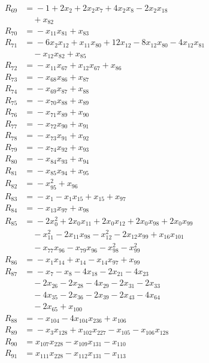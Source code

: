 \begin{align*}
R_{69} &={} -1 +2x_{2} +2x_{2}x_{7} +4x_{2}x_{8} -2x_{2}x_{18} \\
&\quad{} +x_{82} \\
R_{70} &={} -x_{11}x_{81} +x_{83} \\
R_{71} &={} -6x_{2}x_{12} +x_{11}x_{80} +12x_{12} -8x_{12}x_{80} -4x_{12}x_{81} \\
&\quad{} -x_{12}x_{82} +x_{85} \\
R_{72} &={} -x_{11}x_{67} +x_{12}x_{67} +x_{86} \\
R_{73} &={} -x_{68}x_{86} +x_{87} \\
R_{74} &={} -x_{69}x_{87} +x_{88} \\
R_{75} &={} -x_{70}x_{88} +x_{89} \\
R_{76} &={} -x_{71}x_{89} +x_{90} \\
R_{77} &={} -x_{72}x_{90} +x_{91} \\
R_{78} &={} -x_{73}x_{91} +x_{92} \\
R_{79} &={} -x_{74}x_{92} +x_{93} \\
R_{80} &={} -x_{84}x_{93} +x_{94} \\
R_{81} &={} -x_{85}x_{94} +x_{95} \\
R_{82} &={} -x_{95}^{2} +x_{96} \\
R_{83} &={} -x_{1} -x_{1}x_{15} +x_{15} +x_{97} \\
R_{84} &={} -x_{13}x_{97} +x_{98} \\
R_{85} &={} -2x_{0}^{2} +2x_{0}x_{11} +2x_{0}x_{12} +2x_{0}x_{98} +2x_{0}x_{99} \\
&\quad{} -x_{11}^{2} -2x_{11}x_{98} -x_{12}^{2} -2x_{12}x_{99} +x_{16}x_{101} \\
&\quad{} -x_{77}x_{96} -x_{79}x_{96} -x_{98}^{2} -x_{99}^{2} \\
R_{86} &={} -x_{1}x_{14} +x_{14} -x_{14}x_{97} +x_{99} \\
R_{87} &={} -x_{7} -x_{8} -4x_{18} -2x_{21} -4x_{23} \\
&\quad{} -2x_{26} -2x_{28} -4x_{29} -2x_{31} -2x_{33} \\
&\quad{} -4x_{35} -2x_{36} -2x_{39} -2x_{43} -4x_{64} \\
&\quad{} -2x_{65} +x_{100} \\
R_{88} &={} -x_{104} -4x_{104}x_{236} +x_{106} \\
R_{89} &={} -x_{3}x_{128} +x_{102}x_{227} -x_{105} -x_{106}x_{128} \\
R_{90} &={} x_{107}x_{228} -x_{109}x_{131} -x_{110} \\
R_{91} &={} x_{111}x_{228} -x_{112}x_{131} -x_{113} \\

\end{align*}
